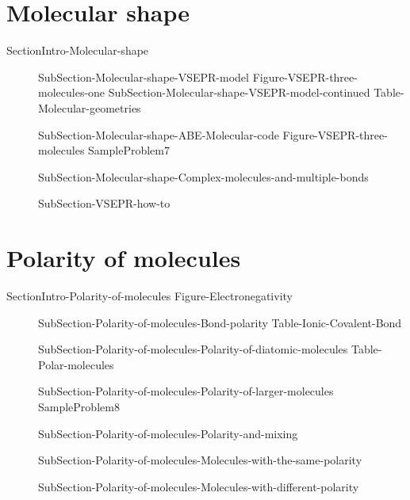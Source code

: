 \documentclass[main.tex]{subfiles}
\newcommand\chapterlabel{Ch-electronicstructure}\setcounter{figurenewcounter}{0}\setcounter{tablenewcounter}{0}\setcounter{formulanewcounter}{0}\chapterpicture{../{\chapterlabel}/figure1}\chapterpicturelabel{PxFuel}
\begin{document}
\section{Molecular shape}{SectionIntro-Molecular-shape}
\sloppy\begin{description}
\item[] {SubSection-Molecular-shape-VSEPR-model}
{Figure-VSEPR-three-molecules-one}
 {SubSection-Molecular-shape-VSEPR-model-continued}
{Table-Molecular-geometries}
\item[] {SubSection-Molecular-shape-ABE-Molecular-code}
{Figure-VSEPR-three-molecules}
{SampleProblem7}
\item[] {SubSection-Molecular-shape-Complex-molecules-and-multiple-bonds}
\item[]{SubSection-VSEPR-how-to}  
\end{description}

\section{Polarity of molecules}{SectionIntro-Polarity-of-molecules}
{Figure-Electronegativity}	
\sloppy \begin{description}
\item[] {SubSection-Polarity-of-molecules-Bond-polarity}
{Table-Ionic-Covalent-Bond}
\item[] {SubSection-Polarity-of-molecules-Polarity-of-diatomic-molecules}
{Table-Polar-molecules}
\item[] {SubSection-Polarity-of-molecules-Polarity-of-larger-molecules}
{SampleProblem8}
\item[] {SubSection-Polarity-of-molecules-Polarity-and-mixing}
\item[] {SubSection-Polarity-of-molecules-Molecules-with-the-same-polarity}
\item[] {SubSection-Polarity-of-molecules-Molecules-with-different-polarity}
\end{description}
\end{document}
